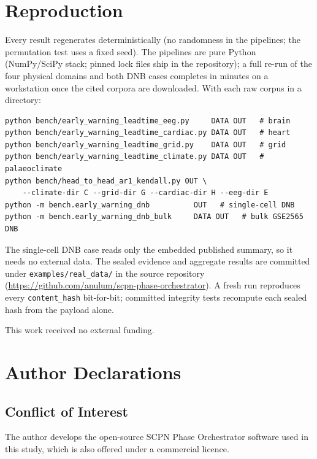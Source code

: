 \documentclass[aip,cha,preprint,amsmath,amssymb]{revtex4-2}
\newcommand{\code}[1]{\texttt{#1}}
\begin{document}
\section{Reproduction}\label{sec:reproduction}

Every result regenerates deterministically (no randomness in the
pipelines; the permutation test uses a fixed seed). The pipelines are
pure Python (NumPy/SciPy stack; pinned lock files ship in the
repository); a full re-run of the four physical domains and both DNB
cases completes in minutes on a workstation once the cited corpora are
downloaded. With each raw corpus in a directory:

\begin{verbatim}
python bench/early_warning_leadtime_eeg.py     DATA OUT   # brain
python bench/early_warning_leadtime_cardiac.py DATA OUT   # heart
python bench/early_warning_leadtime_grid.py    DATA OUT   # grid
python bench/early_warning_leadtime_climate.py DATA OUT   # palaeoclimate
python bench/head_to_head_ar1_kendall.py OUT \
    --climate-dir C --grid-dir G --cardiac-dir H --eeg-dir E
python -m bench.early_warning_dnb          OUT   # single-cell DNB
python -m bench.early_warning_dnb_bulk     DATA OUT   # bulk GSE2565 DNB
\end{verbatim}

The single-cell DNB case reads only the embedded published summary, so
it needs no external data. The sealed evidence and aggregate results
are committed under \code{examples/real\_data/} in the source
repository (\url{https://github.com/anulum/scpn-phase-orchestrator}). A
fresh run reproduces every \code{content\_hash} bit-for-bit; committed
integrity tests recompute each sealed hash from the payload alone.

\begin{acknowledgments}
This work received no external funding.
\end{acknowledgments}

\section*{Author Declarations}

\subsection*{Conflict of Interest}

The author develops the open-source SCPN Phase Orchestrator software
used in this study, which is also offered under a commercial licence.
\end{document}
